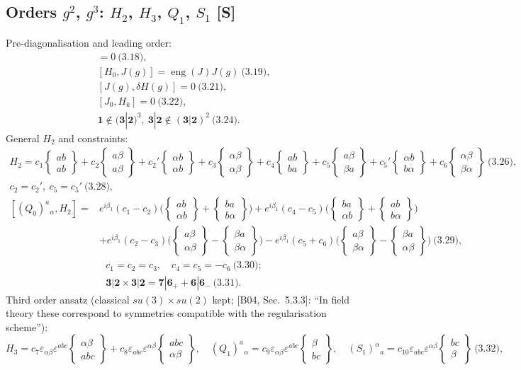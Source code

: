 \documentclass[10pt]{article}
\newcommand{\bs}[2]{\left\{\begin{smallmatrix}#1\\ #2\end{smallmatrix}\right\}}
\begin{document}
\subsection{Orders $g^2$, $g^3$: $H_2$, $H_3$, $Q_1$, $S_1$ [S]}
Pre-diagonalisation and leading order:
\begin{gather*}
[H_0,H(g)]=0\ \text{(3.18)},\\ [H_0,J(g)]=\operatorname{eng}(J)J(g)\ \text{(3.19)},\\ [J(g),\delta H(g)]=0\ \text{(3.21)},\\ [J_0,H_k]=0\ \text{(3.22)},\\ \mathbf 1\notin(\mathbf 3|\mathbf 2)^3,\ \mathbf 3|\mathbf 2\notin(\mathbf 3|\mathbf 2)^2\ \text{(3.24)}.
\end{gather*}
General $H_2$ and constraints:
\begin{gather*}
H_2=c_1\bs{ab}{ab}+c_2\bs{a\beta}{a\beta}+c_2'\bs{\alpha b}{\alpha b}+c_3\bs{\alpha\beta}{\alpha\beta}+c_4\bs{ab}{ba}+c_5\bs{a\beta}{\beta a}+c_5'\bs{\alpha b}{b\alpha}+c_6\bs{\alpha\beta}{\beta\alpha}\ \text{(3.26)},\\ c_2=c_2',\ c_5=c_5'\ \text{(3.28)},
\end{gather*}
\begin{equation*}
\begin{aligned}
{}[(Q_0)^a{}_\alpha,H_2]={}&e^{i\beta_1}(c_1-c_2)\Big(\bs{ab}{\alpha b}+\bs{ba}{b\alpha}\Big)+e^{i\beta_1}(c_4-c_5)\Big(\bs{ba}{\alpha b}+\bs{ab}{b\alpha}\Big)\\
&+e^{i\beta_1}(c_2-c_3)\Big(\bs{a\beta}{\alpha\beta}-\bs{\beta a}{\beta\alpha}\Big)-e^{i\beta_1}(c_5+c_6)\Big(\bs{a\beta}{\beta\alpha}-\bs{\beta a}{\alpha\beta}\Big)\ \text{(3.29)},
\end{aligned}
\end{equation*}
\begin{gather*}
c_1=c_2=c_3,\quad c_4=c_5=-c_6\ \text{(3.30)};\\ \mathbf 3|\mathbf 2\times\mathbf 3|\mathbf 2=\mathbf 7|\mathbf 6_+ +\mathbf 6|\mathbf 6_-\ \text{(3.31)}.
\end{gather*}
Third order ansatz (classical $su(3)\times su(2)$ kept; [B04, Sec.\ 5.3.3]: ``In field theory these correspond to symmetries compatible with the regularisation scheme''):
\begin{equation*}
H_3=c_7\varepsilon_{\alpha\beta}\varepsilon^{abc}\bs{\alpha\beta}{abc}+c_8\varepsilon_{abc}\varepsilon^{\alpha\beta}\bs{abc}{\alpha\beta},\quad (Q_1)^a{}_\alpha=c_9\varepsilon_{\alpha\beta}\varepsilon^{abc}\bs{\beta}{bc},\quad (S_1)^\alpha{}_a=c_{10}\varepsilon_{abc}\varepsilon^{\alpha\beta}\bs{bc}{\beta}\ \text{(3.32)},
\end{equation*}
\end{document}
